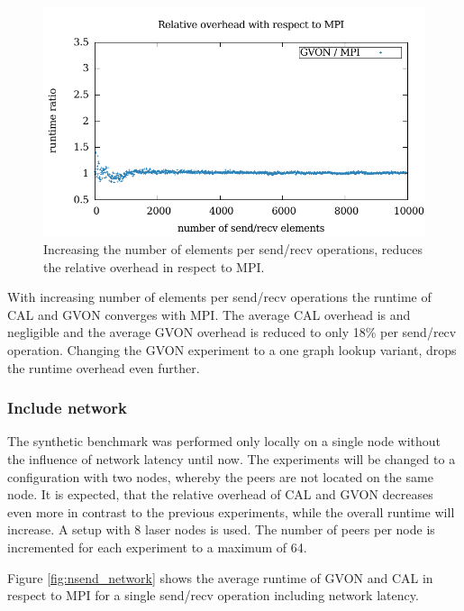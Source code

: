 \begin{figure}[H]
\begin{minipage}[t]{0.5\textwidth}
    \includegraphics[width=\textwidth]{plots/50_nsize_one_lookup_overhead_gvon_kepler}
  \end{minipage}%
  \label{fig:nsize_kepler}
  \caption{Increasing the number of elements per send/recv operations, reduces
  the relative overhead in respect to MPI.}
\end{figure}

With increasing number of elements per send/recv operations the
runtime of CAL and GVON converges with MPI. The average CAL overhead
is and negligible and the average GVON overhead is reduced to only
18\% per send/recv operation. Changing the GVON experiment to a one
graph lookup variant, drops the runtime overhead even further.

\subsubsection*{Include network}
The synthetic benchmark was performed only locally on a single node
without the influence of network latency until now. The experiments
will be changed to a configuration with two nodes, whereby the peers
are not located on the same node. It is expected, that the relative
overhead of CAL and GVON decreases even more in contrast to the
previous experiments, while the overall runtime will increase.  A
setup with 8 laser nodes is used. The number of peers per node is
incremented for each experiment to a maximum of 64.

Figure
\ref{fig:nsend_network} shows the average runtime of GVON and CAL in
respect to MPI for a single send/recv operation including network
latency.

